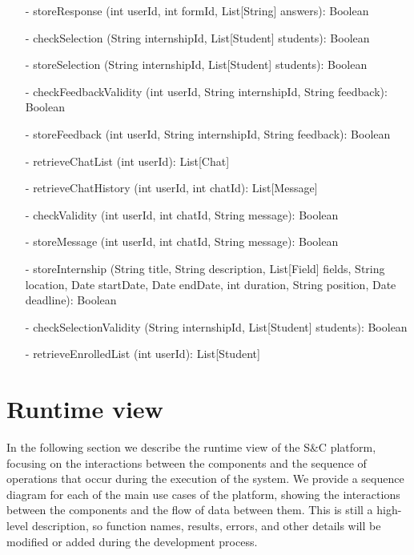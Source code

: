 \begin{itemize}
    \item[-] storeResponse (int userId, int formId, List[String] answers): Boolean
    \item[-] checkSelection (String internshipId, List[Student] students): Boolean
    \item[-] storeSelection (String internshipId, List[Student] students): Boolean
    \item[-] checkFeedbackValidity (int userId, String internshipId, String feedback): Boolean
    \item[-] storeFeedback (int userId, String internshipId, String feedback): Boolean
    \item[-] retrieveChatList (int userId): List[Chat]
    \item[-] retrieveChatHistory (int userId, int chatId): List[Message]
    \item[-] checkValidity (int userId, int chatId, String message): Boolean    
    \item[-] storeMessage (int userId, int chatId, String message): Boolean
    \item[-] storeInternship (String title, String description, List[Field] fields, String location, Date startDate, Date endDate, int duration, String position, Date deadline): Boolean
    \item[-] checkSelectionValidity (String internshipId, List[Student] students): Boolean
    \item[-] retrieveEnrolledList (int userId): List[Student]
\end{itemize}

\section{Runtime view}\label{sec:runtime view}
In the following section we describe the runtime view of the S\&C platform, focusing on the interactions between the components and the 
sequence of operations that occur during the execution of the system. We provide a sequence diagram for each of the main use cases of the
platform, showing the interactions between the components and the flow of data between them. This is still a high-level description, so 
function names, results, errors, and other details will be modified or added during the development process.

